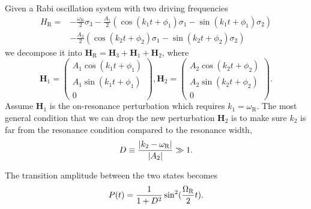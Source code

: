 Given a Rabi oscillation system with two driving frequencies
\begin{align*}
    H_{\mathrm R} =& -\frac{\omega_{\mathrm R}}{2}\sigma_3 - \frac{A_{1} }{2}  \left( \cos(k_{1} t +\phi_{1})\sigma_1  - \sin(k_{1} t +\phi_{1}) \sigma_2\right) \nonumber\\
    & - \frac{A_{2} }{2}  \left( \cos(k_{2} t +\phi_{2})\sigma_1  - \sin(k_{2} t +\phi_{2}) \sigma_2\right)
\end{align*}
we decompose it into $\mathbf{H}_{\mathrm R}=\mathbf{H}_3 + \mathbf{H}_{1} + \mathbf{H}_2$, where
\begin{equation*}
    \mathbf{H}_1 =  \begin{pmatrix}
     A_{1} \cos(k_{1}t+\phi_{1}) \\
     A_{1} \sin(k_{1}t+\phi_{1})  \\
     0
      \end{pmatrix},   \mathbf{H}_2 =  \begin{pmatrix}
     A_{2} \cos(k_{2}t+\phi_{2}) \\
     A_{2} \sin(k_{2}t+\phi_{2})  \\
     0
      \end{pmatrix}.
\end{equation*}
Assume $\mathbf{H}_1$ is the on-resonance perturbation which requires $k_1 = \omega_{\mathrm{R}}$. The most general condition that we can drop the new perturbation $\mathbf{H}_2$ is to make sure $k_2$ is far from the resonance condition compared to the resonance width,
\begin{equation}
D \equiv \frac{\lvert k_2 -\omega_{\mathrm R}\rvert}{\lvert A_2\rvert} \gg 1.
\end{equation}

The transition amplitude between the two states becomes
\begin{equation}
P(t) = \frac{1}{1+D^2}\sin^2(\frac{\Omega_{\mathrm{R}}}{2}t).
\end{equation}


